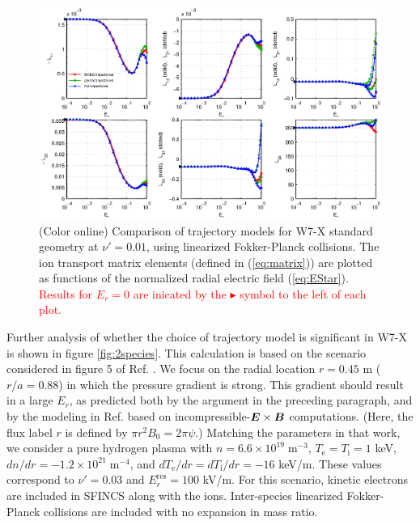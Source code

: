 \documentclass[12pt,superscriptaddress]{revtex4}
\newcommand{\vect}[1]{\mbox{\boldmath $#1$}}
\newcommand{\Ti}{T_{\mathrm{i}}}
\newcommand{\Te}{T_{\mathrm{e}}}
\newcommand{\Erres}{E_r^{\mathrm{res}}}
\newcommand{\changed}[1]{\textcolor{red}{#1}}
\begin{document}
\begin{figure}[h!]
\includegraphics{m20140205_03_plotSFINCSFortranErComparisonForPaper_W7X.eps}
\caption{(Color online) Comparison of trajectory models for W7-X standard geometry at $\nu' = 0.01$,
using linearized Fokker-Planck collisions.
The ion transport matrix elements (defined in (\ref{eq:matrix})) are plotted as functions
of the normalized radial electric field (\ref{eq:EStar}).
\changed{Results for $E_r=0$ are inicated by the $\blacktriangleright$ symbol to the left of each plot.}
\label{fig:ErComparison_W7X}}
\end{figure}



Further analysis of whether the choice of trajectory model is significant in W7-X
is shown in figure  \ref{fig:2species}.
This calculation is based on the scenario considered in figure 5 of Ref. \cite{Turkin}. 
We focus on the radial location $r=0.45$ m ($r/a=0.88$)
in which the pressure gradient is strong.  This gradient should result in a large $E_r$, as predicted 
both by the argument in the preceding paragraph, and by
the modeling in Ref. \cite{Turkin} based on incompressible-$\vect{E}\times\vect{B}$ computations.
(Here, the flux label $r$ is defined by $\pi r^2 B_0 = 2 \pi \psi$.)
Matching the parameters in that work, we consider a pure hydrogen plasma with $n=6.6\times 10^{19}\; \mathrm{m}^{-3}$,
$\Te=\Ti=1$ keV, $dn/dr = -1.2\times 10^{21} \;\mathrm{m}^{-4}$, and $d\Te/dr=d\Ti/dr = -16$ keV/m.
These values correspond to $\nu'=0.03$ and $\Erres = 100 $ kV/m.
For this scenario, kinetic electrons are included in SFINCS along with the ions.
Inter-species linearized Fokker-Planck collisions are included with no expansion in mass ratio.
\end{document}
